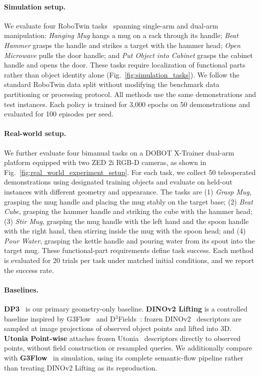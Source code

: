 \paragraph{Simulation setup.}
We evaluate four RoboTwin tasks~\cite{chen2025robotwin} spanning single-arm and dual-arm manipulation: \emph{Hanging Mug} hangs a mug on a rack through its handle; \emph{Beat Hammer} grasps the handle and strikes a target with the hammer head; \emph{Open Microwave} pulls the door handle; and \emph{Put Object into Cabinet} grasps the cabinet handle and opens the door. These tasks require localization of functional parts rather than object identity alone (Fig.~\ref{fig:simulation_tasks}). We follow the standard RoboTwin data split without modifying the benchmark data partitioning or processing protocol. All methods use the same demonstrations and test instances. Each policy is trained for 3,000 epochs on 50 demonstrations and evaluated for 100 episodes per seed.


\paragraph{Real-world setup.}
We further evaluate four bimanual tasks on a DOBOT X-Trainer dual-arm platform equipped with two ZED 2i RGB-D cameras, as shown in Fig.~\ref{fig:real_world_experiment_setup}. For each task, we collect 50 teleoperated demonstrations using designated training objects and evaluate on held-out instances with different geometry and appearance. The tasks are (1) \emph{Grasp Mug}, grasping the mug handle and placing the mug stably on the target base; (2) \emph{Beat Cube}, grasping the hammer handle and striking the cube with the hammer head; (3) \emph{Stir Mug}, grasping the mug handle with the left hand and the spoon handle with the right hand, then stirring inside the mug with the spoon head; and (4) \emph{Pour Water}, grasping the kettle handle and pouring water from its spout into the target mug. These functional-part requirements define task success. Each method is evaluated for 20 trials per task under matched initial conditions, and we report the success rate.


\paragraph{Baselines.}
\textbf{DP3}~\cite{ze20243d} is our primary geometry-only baseline. \textbf{DINOv2 Lifting} is a controlled baseline inspired by G3Flow~\cite{chen2025g3flow} and D$^3$Fields~\cite{wang2023d}: frozen DINOv2~\cite{oquab2023dinov2} descriptors are sampled at image projections of observed object points and lifted into 3D. \textbf{Utonia Point-wise} attaches frozen Utonia~\cite{zhang2026utonia} descriptors directly to observed points, without field construction or resampled queries. We additionally compare with \textbf{G3Flow}~\cite{chen2025g3flow} in simulation, using its complete semantic-flow pipeline rather than treating DINOv2 Lifting as its reproduction.


